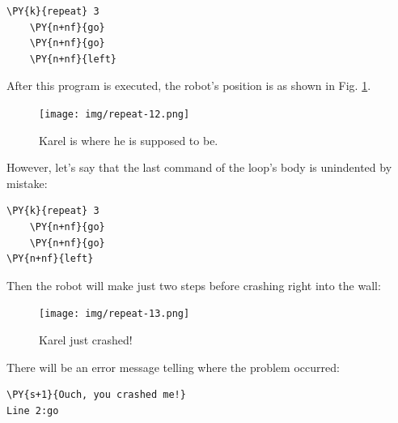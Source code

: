 \begin{bbox}
\begin{Verbatim}[commandchars=\\\{\}]
\PY{k}{repeat} 3
    \PY{n+nf}{go}
    \PY{n+nf}{go}
    \PY{n+nf}{left}
\end{Verbatim}
\end{bbox}
\vspace{6mm}

\noindent
After this program is executed, the robot's position is 
as shown in Fig. \ref{fig:repeat-12}.

\begin{figure}[!ht]
\begin{center}
\texttt{[image: img/repeat-12.png]}
\vspace{-0mm}
\caption{Karel is where he is supposed to be.}
\label{fig:repeat-12}
\end{center}
\end{figure}
\noindent
However, let's say that the last command of the loop's body is
unindented by mistake:

\begin{bbox}
\begin{Verbatim}[commandchars=\\\{\}]
\PY{k}{repeat} 3
    \PY{n+nf}{go}
    \PY{n+nf}{go}
\PY{n+nf}{left}
\end{Verbatim}
\end{bbox}
\vspace{6mm}

\noindent
Then the robot will make just two steps before crashing right into the wall:

\begin{figure}[!ht]
\begin{center}
\texttt{[image: img/repeat-13.png]}
\vspace{-0mm}
\caption{Karel just crashed!}
\label{fig:repeat-13}
\end{center}
\end{figure}
\noindent
There will be an error message telling where the problem occurred:\\

\begin{ybox}
\begin{Verbatim}[commandchars=\\\{\}]
\PY{s+1}{Ouch, you crashed me!}
Line 2:go
\end{Verbatim}
\end{ybox}
\vspace{6mm}


